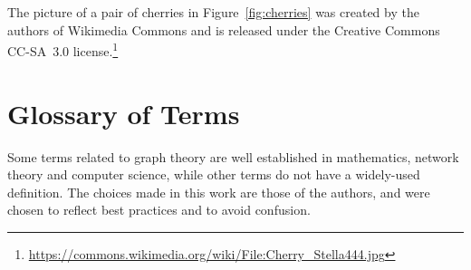 \documentclass{article}
\begin{document}
The picture of a pair of cherries in Figure~\ref{fig:cherries} was
created by the authors of Wikimedia Commons and is released under the
Creative Commons CC-SA~3.0 license.\footnote{\url{https://commons.wikimedia.org/wiki/File:Cherry_Stella444.jpg}}

\let\oldbibliography\thebibliography
\renewcommand{\thebibliography}[1]{%
  \oldbibliography{#1}%
  \setlength{\itemsep}{0pt}%
}



\appendix

\section{Glossary of Terms}
Some terms related to graph theory are well established in mathematics,
network theory and computer science, while other terms do not have a
widely-used definition.  
The choices made in this work are those of the authors, and were chosen
to reflect best practices and to avoid confusion.
\end{document}
